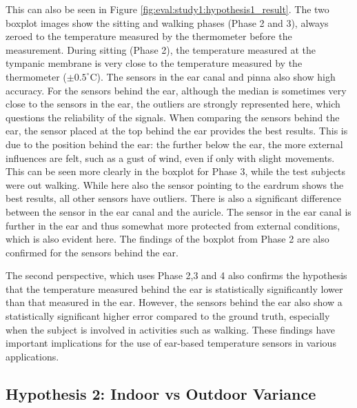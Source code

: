 This can also be seen in Figure \ref{fig:eval:study1:hypothesis1_result}.
The two boxplot images show the sitting and walking phases (Phase 2 and 3), always zeroed to the temperature measured by the thermometer before the measurement.
During sitting (Phase 2), the temperature measured at the tympanic membrane is very close to the temperature measured by the thermometer ($\pm0.5^\circ\text{C}$). 
The sensors in the ear canal and pinna also show high accuracy. 
For the sensors behind the ear, although the median is sometimes very close to the sensors in the ear, the outliers are strongly represented here, which questions the reliability of the signals.
When comparing the sensors behind the ear, the sensor placed at the top behind the ear provides the best results. 
This is due to the position behind the ear: the further below the ear, the more external influences are felt, such as a gust of wind, even if only with slight movements.
This can be seen more clearly in the boxplot for Phase 3, while the test subjects were out walking. 
While here also the sensor pointing to the eardrum shows the best results, all other sensors have outliers.
There is also a significant difference between the sensor in the ear canal and the auricle. 
The sensor in the ear canal is further in the ear and thus somewhat more protected from external conditions, which is also evident here. 
The findings of the boxplot from Phase 2 are also confirmed for the sensors behind the ear.

The second perspective, which uses Phase 2,3 and 4 also confirms the hypothesis that the temperature measured behind the ear is statistically significantly lower than that measured in the ear. 
However, the sensors behind the ear also show a statistically significant higher error compared to the ground truth, especially when the subject is involved in activities such as walking. 
These findings have important implications for the use of ear-based temperature sensors in various applications.

\subsection{Hypothesis 2: Indoor vs Outdoor Variance}
\label{subsec:Evaluation:Study2:Hypothesis2}

